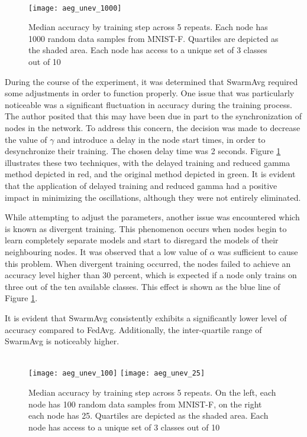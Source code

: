 \begin{figure}[H] 
	 \\
	\texttt{[image: aeg\_unev\_1000]}
	\caption{Median accuracy by training step across 5 repeats. Each node has 1000 random data samples from MNIST-F. Quartiles are depicted as the shaded area. Each node has access to a unique set of 3 classes out of 10}
	\label{aeg7}
\end{figure}

During the course of the experiment, it was determined that SwarmAvg required some adjustments in order to function properly. One issue that was particularly noticeable was a significant fluctuation in accuracy during the training process. The author posited that this may have been due in part to the synchronization of nodes in the network. To address this concern, the decision was made to decrease the value of $\gamma$ and introduce a delay in the node start times, in order to desynchronize their training. The chosen delay time was 2 seconds. Figure \ref{aeg7} illustrates these two techniques, with the delayed training and reduced gamma method depicted in red, and the original method depicted in green. It is evident that the application of delayed training and reduced gamma had a positive impact in minimizing the oscillations, although they were not entirely eliminated.

While attempting to adjust the parameters, another issue was encountered which is known as divergent training. This phenomenon occurs when nodes begin to learn completely separate models and start to disregard the models of their neighbouring nodes. It was observed that a low value of $\alpha$ was sufficient to cause this problem. When divergent training occurred, the nodes failed to achieve an accuracy level higher than 30 percent, which is expected if a node only trains on three out of the ten available classes. This effect is shown as the blue line of Figure \ref{aeg7}.

It is evident that SwarmAvg consistently exhibits a significantly lower level of accuracy compared to FedAvg. Additionally, the inter-quartile range of SwarmAvg is noticeably higher.

\begin{figure}[H] 
	 \\
	\texttt{[image: aeg\_unev\_100]}
	\texttt{[image: aeg\_unev\_25]}
	\caption{Median accuracy by training step across 5 repeats. On the left, each node has 100 random data samples from MNIST-F, on the right each node has 25. Quartiles are depicted as the shaded area. Each node has access to a unique set of 3 classes out of 10}
	\label{aeg8}
\end{figure}

